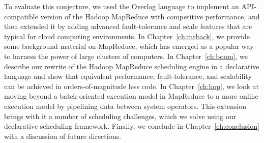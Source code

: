 To evaluate this conjecture, we used the Overlog language to implement an API-compatible version of the Hadoop 
MapReduce with competitive performance, and then extended it by adding advanced fault-tolerance and scale features 
that are typical for cloud computing environments. In Chapter~\ref{ch:mrback}, we provide some background material on 
MapReduce, which has emerged as a popular way to harness the power of large clusters of computers. In Chapter~\ref{ch:boom}, 
we describe our rewrite of the Hadoop MapReduce scheduling engine in a declarative language and show that equivalent 
performance, fault-tolerance, and scalability can be achieved in orders-of-magnitude less code. In Chapter~\ref{ch:hop}, we 
look at moving beyond a batch-oriented execution model in MapReduce to a more online execution model by pipelining 
data between system operators. This extension brings with it a number of scheduling challenges, which we solve
using our declarative scheduling framework. Finally, we conclude in Chapter~\ref{ch:conclusion} with a discussion 
of future directions.







